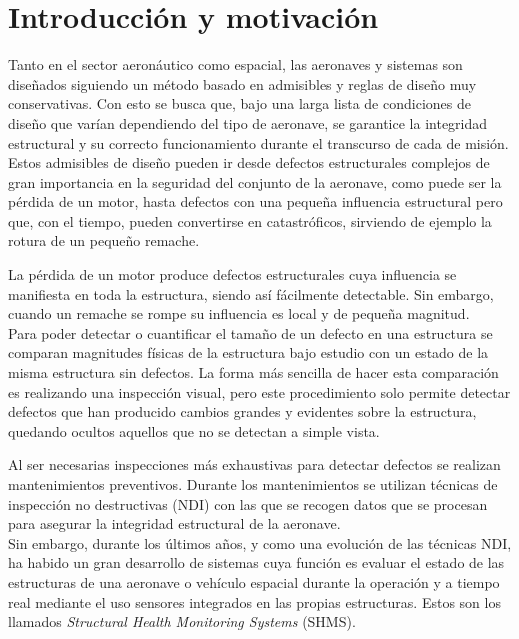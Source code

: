 \chapter{Introducción y motivación}

Tanto en el sector aeronáutico como espacial, las aeronaves y sistemas son diseñados siguiendo un método basado en admisibles y reglas de diseño muy conservativas. Con esto se busca que, bajo una larga lista de condiciones de diseño que varían dependiendo del tipo de aeronave, se garantice la integridad estructural y su correcto funcionamiento durante el transcurso de cada de misión.\\

Estos admisibles de diseño pueden ir desde defectos estructurales complejos de gran importancia en la seguridad del conjunto de la aeronave, como puede ser la pérdida de un motor, hasta defectos con una pequeña influencia estructural pero que, con el tiempo, pueden convertirse en catastróficos, sirviendo de ejemplo la rotura de un pequeño remache.

La pérdida de un motor produce defectos estructurales cuya influencia se manifiesta en toda la estructura, siendo así fácilmente detectable. Sin embargo, cuando un remache se rompe su influencia es local y de pequeña magnitud.\\

Para poder detectar o cuantificar el tamaño de un defecto en una estructura se comparan magnitudes físicas de la estructura bajo estudio con un estado de la misma estructura sin defectos. La forma más sencilla de hacer esta comparación es realizando una inspección visual, pero este procedimiento solo permite detectar defectos que han producido cambios grandes y evidentes sobre la estructura, quedando ocultos aquellos que no se detectan a simple vista.

Al ser necesarias inspecciones más exhaustivas para detectar defectos se realizan mantenimientos preventivos. Durante los mantenimientos se utilizan técnicas de inspección no destructivas (NDI) con las que se recogen datos que se procesan para asegurar la integridad estructural de la aeronave.\\

Sin embargo, durante los últimos años, y como una evolución de las técnicas NDI, ha habido un gran desarrollo de sistemas cuya función es evaluar el estado de las estructuras de una aeronave o vehículo espacial durante la operación y a tiempo real mediante el uso sensores integrados en las propias estructuras. Estos son los llamados \textit{Structural Health Monitoring Systems} (SHMS).

